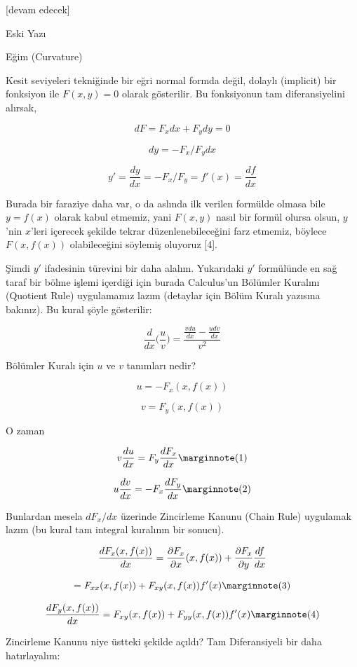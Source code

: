 \documentclass[12pt,fleqn]{article}\usepackage{../../common}
\begin{document}
\vspace{100in}

[devam edecek]

Eski Yazı

Eğim (Curvature)

Kesit seviyeleri tekniğinde bir eğri normal formda değil, dolaylı
(implicit) bir fonksiyon ile $F(x,y) = 0$ olarak gösterilir. Bu fonksiyonun
tam diferansiyelini alırsak,

$$ dF = F_x dx + F_y dy = 0  $$

$$ dy = -F_x / F_y dx  $$

$$ y' = \frac{dy}{dx} = -F_x / F_y = f'(x) = \frac{df}{dx} $$

Burada bir faraziye daha var, o da aslında ilk verilen formülde olmasa bile
$y=f(x)$ olarak kabul etmemiz, yani $F(x,y)$ nasıl bir formül olursa olsun,
$y$'nin $x$'leri içerecek şekilde tekrar düzenlenebileceğini farz etmemiz,
böylece $F(x,f(x))$ olabileceğini söylemiş oluyoruz [4].

Şimdi $y'$ ifadesinin türevini bir daha alalım. Yukarıdaki $y'$ formülünde
en sağ taraf bir bölme işlemi içerdiği için burada Calculus'un Bölümler
Kuralını (Quotient Rule) uygulamamız lazım (detaylar için Bölüm Kuralı
yazısına bakınız). Bu kural şöyle gösterilir:

$$ \frac{d}{dx}\bigg(\frac{u}{v}\bigg) = 
\frac{\displaystyle \frac{v du}{dx} - \frac{u dv}{dx}}{v^2} $$

Bölümler Kuralı için $u$ ve $v$ tanımları nedir? 

$$ u = -F_x(x,f(x))  $$

$$ v = F_y(x,f(x)) $$

O zaman

$$ 
v \frac{du}{dx} = F_y \frac{dF_x}{dx} 
\mlabel{1}
$$

$$
u \frac{dv}{dx} = -F_x \frac{dF_y }{dx} 
\mlabel{2}
$$

Bunlardan mesela $dF_x/dx$ üzerinde Zincirleme Kanunu (Chain Rule) uygulamak
lazım (bu kural tam integral kuralının bir sonucu). 

$$ \frac{d F_x(x,f(x)) }{dx} = \frac{\partial F_x}{\partial  x}(x,f(x))+\frac{\partial F_x}{\partial y}\frac{df}{dx}\\ $$

$$
= F_{xx}(x,f(x))+F_{xy}(x,f(x))f'(x) 
\mlabel{3}
$$

$$
\frac{d F_y(x,f(x)) }{dx} =  F_{xy}(x,f(x))+F_{yy}(x,f(x))f'(x) 
\mlabel{4}
$$

Zincirleme Kanunu niye üstteki şekilde açıldı? Tam Diferansiyeli bir daha
hatırlayalım:
\end{document}
